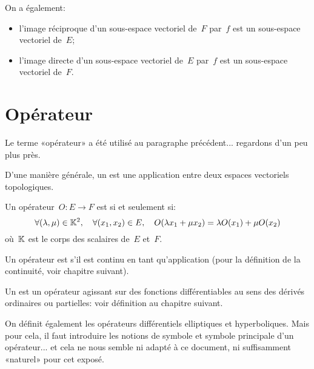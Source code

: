 On a également:
\begin{itemize}
  \item l'image réciproque d'un sous-espace vectoriel de~$F$ par~$f$ est un sous-espace vectoriel de~$E$;
  \item l'image directe d'un sous-espace vectoriel de~$E$ par~$f$ est un sous-espace vectoriel de~$F$.
\end{itemize}

\medskip
\section{Opérateur}

Le terme «opérateur» a été utilisé au paragraphe précédent... regardons d'un peu plus près.

\medskip
D'une manière générale, un  est une application entre deux espaces vectoriels topologiques.

\medskip
Un opérateur~$O: E \to F$ est  si et seulement si:
\begin{equation}\forall (\lambda, \mu) \in \mathbb K^2,\quad\forall (x_1, x_2) \in E,\quad O( \lambda x_1 + \mu x_2)=\lambda O(x_1) + \mu O(x_2)
\end{equation}
où~$\mathbb K$ est le corps des scalaires de~$E$ et~$F$.

\medskip
{}

\medskip
Un opérateur est  s'il est continu en tant qu'application (pour la définition de la continuité, voir chapitre suivant).


\medskip
Un  est un opérateur agissant sur des fonctions différentiables au sens des dérivés ordinaires ou partielles: voir définition au chapitre suivant.

\medskip
On définit également les opérateurs différentiels elliptiques et hyperboliques.
Mais pour cela, il faut introduire les notions de symbole et symbole principale d'un opérateur... et cela ne nous semble ni adapté à ce document, ni suffisamment «naturel» pour cet exposé.



